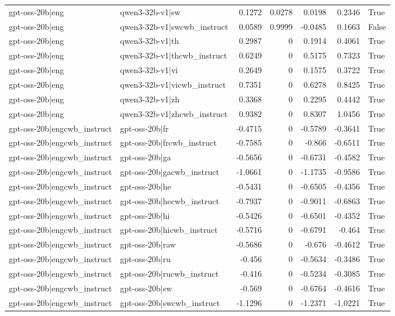 \begin{table}
\begin{tabular}{l l r r r r l}
gpt-oss-20b|eng & qwen3-32b-v1|sw & 0.1272 & 0.0278 & 0.0198 & 0.2346 & True \\
gpt-oss-20b|eng & qwen3-32b-v1|swcwb_instruct & 0.0589 & 0.9999 & -0.0485 & 0.1663 & False \\
gpt-oss-20b|eng & qwen3-32b-v1|th & 0.2987 & 0 & 0.1914 & 0.4061 & True \\
gpt-oss-20b|eng & qwen3-32b-v1|thcwb_instruct & 0.6249 & 0 & 0.5175 & 0.7323 & True \\
gpt-oss-20b|eng & qwen3-32b-v1|vi & 0.2649 & 0 & 0.1575 & 0.3722 & True \\
gpt-oss-20b|eng & qwen3-32b-v1|vicwb_instruct & 0.7351 & 0 & 0.6278 & 0.8425 & True \\
gpt-oss-20b|eng & qwen3-32b-v1|zh & 0.3368 & 0 & 0.2295 & 0.4442 & True \\
gpt-oss-20b|eng & qwen3-32b-v1|zhcwb_instruct & 0.9382 & 0 & 0.8307 & 1.0456 & True \\
gpt-oss-20b|engcwb_instruct & gpt-oss-20b|fr & -0.4715 & 0 & -0.5789 & -0.3641 & True \\
gpt-oss-20b|engcwb_instruct & gpt-oss-20b|frcwb_instruct & -0.7585 & 0 & -0.866 & -0.6511 & True \\
gpt-oss-20b|engcwb_instruct & gpt-oss-20b|ga & -0.5656 & 0 & -0.6731 & -0.4582 & True \\
gpt-oss-20b|engcwb_instruct & gpt-oss-20b|gacwb_instruct & -1.0661 & 0 & -1.1735 & -0.9586 & True \\
gpt-oss-20b|engcwb_instruct & gpt-oss-20b|he & -0.5431 & 0 & -0.6505 & -0.4356 & True \\
gpt-oss-20b|engcwb_instruct & gpt-oss-20b|hecwb_instruct & -0.7937 & 0 & -0.9011 & -0.6863 & True \\
gpt-oss-20b|engcwb_instruct & gpt-oss-20b|hi & -0.5426 & 0 & -0.6501 & -0.4352 & True \\
gpt-oss-20b|engcwb_instruct & gpt-oss-20b|hicwb_instruct & -0.5716 & 0 & -0.6791 & -0.464 & True \\
gpt-oss-20b|engcwb_instruct & gpt-oss-20b|raw & -0.5686 & 0 & -0.676 & -0.4612 & True \\
gpt-oss-20b|engcwb_instruct & gpt-oss-20b|ru & -0.456 & 0 & -0.5634 & -0.3486 & True \\
gpt-oss-20b|engcwb_instruct & gpt-oss-20b|rucwb_instruct & -0.416 & 0 & -0.5234 & -0.3085 & True \\
gpt-oss-20b|engcwb_instruct & gpt-oss-20b|sw & -0.569 & 0 & -0.6764 & -0.4616 & True \\
gpt-oss-20b|engcwb_instruct & gpt-oss-20b|swcwb_instruct & -1.1296 & 0 & -1.2371 & -1.0221 & True \\

\end{tabular}
\end{table}
